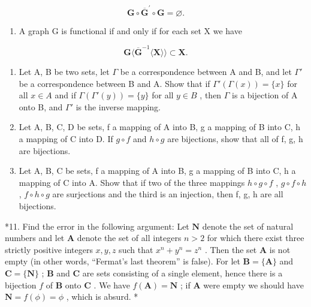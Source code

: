 \[
\mathbf {G} \circ \overline {{\mathbf {G}}} ^ {\prime} \circ \mathbf {G} = \varnothing .
\]

\begin{enumerate}
\def\labelenumi{\arabic{enumi}.}
\setcounter{enumi}{6}
\tightlist
\item
  A graph G is functional if and only if for each set X we have
\end{enumerate}

\[
\mathbf {G} \langle \overline {{\mathbf {G}}} ^ {- 1} \langle \mathbf {X} \rangle \rangle \subset \mathbf {X}.
\]

\begin{enumerate}
\def\labelenumi{\arabic{enumi}.}
\setcounter{enumi}{7}
\item
  Let A, B be two sets, let \(\Gamma\) be a correspondence between A and B, and let \(\Gamma'\) be a correspondence between B and A. Show that if \(\Gamma'(\Gamma(x)) = \{x\}\) for all \(x \in A\) and if \(\Gamma(\Gamma'(y)) = \{y\}\) for all \(y \in B\) , then \(\Gamma\) is a bijection of A onto B, and \(\Gamma'\) is the inverse mapping.
\item
  Let A, B, C, D be sets, f a mapping of A into B, g a mapping of B into C, h a mapping of C into D. If \(g \circ f\) and \(h \circ g\) are bijections, show that all of f, g, h are bijections.
\item
  Let A, B, C be sets, f a mapping of A into B, g a mapping of B into C, h a mapping of C into A. Show that if two of the three mappings \(h \circ g \circ f\) , \(g \circ f \circ h\) , \(f \circ h \circ g\) are surjections and the third is an injection, then f, g, h are all bijections.
\end{enumerate}

*11. Find the error in the following argument: Let \(\mathbf{N}\) denote the set of natural numbers and let \(\mathbf{A}\) denote the set of all integers \(n > 2\) for which there exist three strictly positive integers \(x, y, z\) such that \(x^n + y^n = z^n\) . Then the set \(\mathbf{A}\) is not empty (in other words, ``Fermat's last theorem'' is false). For let \(\mathbf{B} = \{\mathbf{A}\}\) and \(\mathbf{C} = \{\mathbf{N}\}\) ; \(\mathbf{B}\) and \(\mathbf{C}\) are sets consisting of a single element, hence there is a bijection \(f\) of \(\mathbf{B}\) onto \(\mathbf{C}\) . We have \(f(\mathbf{A}) = \mathbf{N}\) ; if \(\mathbf{A}\) were empty we should have \(\mathbf{N} = f(\phi) = \phi\) , which is absurd. *

